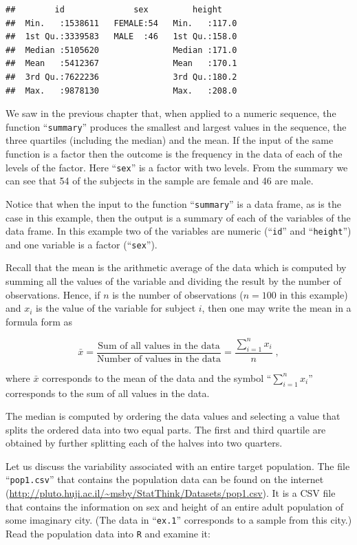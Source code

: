 \documentclass[
]{krantz}
\theoremstyle{definition}
\theoremstyle{definition}
\theoremstyle{definition}
\theoremstyle{remark}
\begin{document}
\begin{verbatim}
##        id              sex         height     
##  Min.   :1538611   FEMALE:54   Min.   :117.0  
##  1st Qu.:3339583   MALE  :46   1st Qu.:158.0  
##  Median :5105620               Median :171.0  
##  Mean   :5412367               Mean   :170.1  
##  3rd Qu.:7622236               3rd Qu.:180.2  
##  Max.   :9878130               Max.   :208.0
\end{verbatim}

We saw in the previous chapter that, when applied to a numeric sequence,
the function ``\texttt{summary}'' produces the smallest and largest values in the
sequence, the three quartiles (including the median) and the mean. If
the input of the same function is a factor then the outcome is the
frequency in the data of each of the levels of the factor. Here ``\texttt{sex}''
is a factor with two levels. From the summary we can see that 54 of the
subjects in the sample are female and 46 are male.

Notice that when the input to the function ``\texttt{summary}'' is a data frame,
as is the case in this example, then the output is a summary of each of
the variables of the data frame. In this example two of the variables
are numeric (``\texttt{id}'' and ``\texttt{height}'') and one variable is a factor
(``\texttt{sex}'').

Recall that the mean is the arithmetic average of the data which is
computed by summing all the values of the variable and dividing the
result by the number of observations. Hence, if \(n\) is the number of
observations (\(n=100\) in this example) and \(x_i\) is the value of the
variable for subject \(i\), then one may write the mean in a formula form
as

\[\bar x = \frac{\mbox{Sum of all values in the data}}{\mbox{Number of values in the data}} = \frac{\sum_{i=1}^n x_i}{n}\;,\]

where \(\bar x\) corresponds to the mean of the data and the symbol
``\(\sum_{i=1}^n x_i\)'' corresponds to the sum of all values in the data.

The median is computed by ordering the data values and selecting a value
that splits the ordered data into two equal parts. The first and third
quartile are obtained by further splitting each of the halves into two
quarters.

Let us discuss the variability associated with an entire target
population. The file ``\texttt{pop1.csv}'' that contains the population data can
be found on the internet
(\url{http://pluto.huji.ac.il/~msby/StatThink/Datasets/pop1.csv}). It is a
CSV file that contains the information on sex and height of an entire
adult population of some imaginary city. (The data in ``\texttt{ex.1}''
corresponds to a sample from this city.) Read the population data into
\texttt{R} and examine it:
\end{document}
